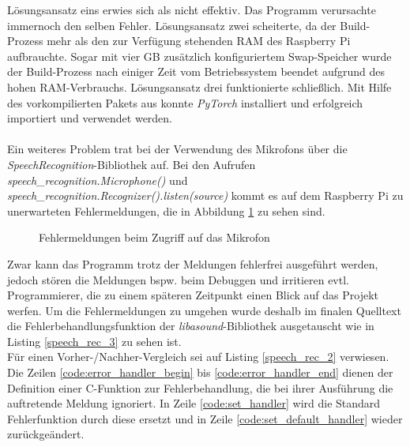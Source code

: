 Lösungsansatz eins erwies sich als nicht effektiv. Das Programm verursachte immernoch den selben Fehler. Lösungsansatz zwei scheiterte, da der Build-Prozess mehr als den zur Verfügung stehenden \ac{RAM} des Raspberry Pi aufbrauchte. Sogar mit vier \ac{GB} zusätzlich konfiguriertem Swap-Speicher wurde der Build-Prozess nach einiger Zeit vom Betriebssystem beendet aufgrund des hohen \ac{RAM}-Verbrauchs. Lösungsansatz drei funktionierte schließlich. Mit Hilfe des vorkompilierten Pakets aus \cite{q-engineering_install_nodate} konnte \textit{PyTorch} installiert und erfolgreich importiert und verwendet werden.\\\\
Ein weiteres Problem trat bei der Verwendung des Mikrofons über die \textit{SpeechRecognition}-Bibliothek auf. Bei den Aufrufen \textit{speech\_recognition.Microphone()} und\\ \textit{speech\_recognition.Recognizer().listen(source)} kommt es auf dem Raspberry Pi zu unerwarteten Fehlermeldungen, die in Abbildung \ref{img:alsa_errors} zu sehen sind.
\begin{figure}[H]
    \centering
    \caption{Fehlermeldungen beim Zugriff auf das Mikrofon}
    \label{img:alsa_errors}
\end{figure}
\noindent
Zwar kann das Programm trotz der Meldungen fehlerfrei ausgeführt werden, jedoch stören die Meldungen bspw. beim Debuggen und irritieren evtl. Programmierer, die zu einem späteren Zeitpunkt einen Blick auf das Projekt werfen. Um die Fehlermeldungen zu umgehen wurde deshalb im finalen Quelltext die Fehlerbehandlungsfunktion der \textit{libasound}-Bibliothek ausgetauscht wie in Listing \ref{speech_rec_3} zu sehen ist.\\

Für einen Vorher-/Nachher-Vergleich sei auf Listing \ref{speech_rec_2} verwiesen. Die Zeilen \ref{code:error_handler_begin} bis \ref{code:error_handler_end} dienen der Definition einer C-Funktion zur Fehlerbehandlung, die bei ihrer Ausführung die auftretende Meldung ignoriert. In Zeile \ref{code:set_handler} wird die Standard Fehlerfunktion durch diese ersetzt und in Zeile \ref{code:set_default_handler} wieder zurückgeändert. 
